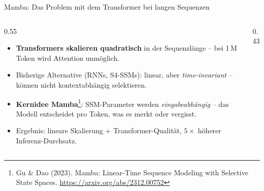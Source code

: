 \documentclass[aspectratio=1610, xcolor=dvipsnames, 9pt]{beamer}
\begin{document}
\begin{frame}{Mamba: Das Problem mit dem Transformer bei langen Sequenzen}
  \begin{columns}
    \begin{column}{0.55\textwidth}
      \begin{itemize}
        \item \textbf{Transformers skalieren quadratisch} in der Sequenzlänge -- bei 1\,M Token wird Attention unmöglich.
        \item Bisherige Alternative (RNNs, S4-SSMs): linear, aber \emph{time-invariant} -- können nicht kontextabhängig selektieren.
        \item \textbf{Kernidee Mamba}\footnote{Gu \& Dao (2023). Mamba: Linear-Time Sequence Modeling with Selective State Spaces. \url{https://arxiv.org/abs/2312.00752}}: SSM-Parameter werden \emph{eingabeabhängig} -- das Modell entscheidet pro Token, was es merkt oder vergisst.
        \item Ergebnis: lineare Skalierung + Transformer-Qualität, $5\times$ höherer Inferenz-Durchsatz.
      \end{itemize}
    \end{column}
    \begin{column}{0.43\textwidth}
      \centering
    \end{column}
  \end{columns}
\end{frame}
\end{document}
